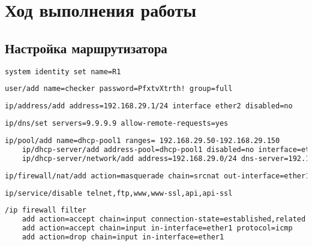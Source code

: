 \section{Ход выполнения работы}

\subsection{Настройка маршрутизатора}

\begin{lstlisting}[language=bash, caption=Настройка имени]
    system identity set name=R1
\end{lstlisting}

\begin{lstlisting}[language=bash, caption=Создание нового пользователя]
    user/add name=checker password=PfxtvXtrth! group=full
\end{lstlisting}

\begin{lstlisting}[language=bash, caption=Настройка $IP$]
    ip/address/add address=192.168.29.1/24 interface ether2 disabled=no
\end{lstlisting}

\begin{lstlisting}[language=bash, caption=Настройка $DNS$]
    ip/dns/set servers=9.9.9.9 allow-remote-requests=yes
\end{lstlisting}

\begin{lstlisting}[language=bash, caption=Настройка $DHPS$]
    ip/pool/add name=dhcp-pool1 ranges= 192.168.29.50-192.168.29.150
    ip/dhcp-server/add address-pool=dhcp-pool1 disabled=no interface=ether2
    ip/dhcp-server/network/add address=192.168.29.0/24 dns-server=192.168.29.1 gateway=192.168.29.1
\end{lstlisting}

\begin{lstlisting}[language=bash, caption=Настройка $NAT$]
    ip/firewall/nat/add action=masquerade chain=srcnat out-interface=ether1
\end{lstlisting}

\begin{lstlisting}[language=bash, caption=Отключение ненужных соединений]
    ip/service/disable telnet,ftp,www,www-ssl,api,api-ssl
\end{lstlisting}

\begin{lstlisting}[language=bash, caption=Настройка фаерволла]
    /ip firewall filter
    add action=accept chain=input connection-state=established,related in-interface=ether1
    add action=accept chain=input in-interface=ether1 protocol=icmp
    add action=drop chain=input in-interface=ether1    
\end{lstlisting}

